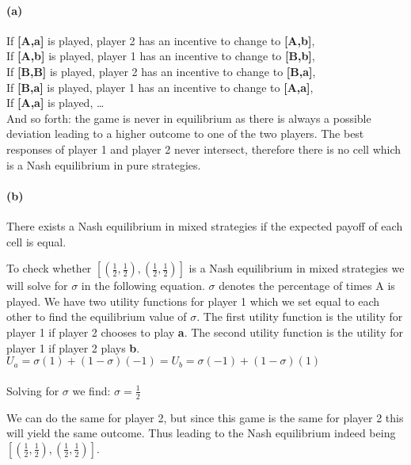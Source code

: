 \documentclass[]{article}
\let\oldparagraph\paragraph
\renewcommand{\paragraph}[1]{\oldparagraph{#1}\mbox{}}
\begin{document}
\paragraph{(a)}\label{a}

If \textbf{[A,a]} is played, player 2 has an incentive to change to
\textbf{[A,b]},\\
If \textbf{[A,b]} is played, player 1 has an incentive to change to
\textbf{[B,b]},\\
If \textbf{[B,B]} is played, player 2 has an incentive to change to
\textbf{[B,a]},\\
If \textbf{[B,a]} is played, player 1 has an incentive to change to
\textbf{[A,a]},\\
If \textbf{[A,a]} is played, \ldots{}\\
And so forth: the game is never in equilibrium as there is always a
possible deviation leading to a higher outcome to one of the two
players. The best responses of player 1 and player 2 never intersect, therefore there is no cell which is a Nash equilibrium in pure strategies.

\paragraph{(b)}\label{b}

There exists a Nash equilibrium in mixed strategies if the expected
payoff of each cell is equal. 

To check whether $[(\frac{1}{2},\frac{1}{2}),(\frac{1}{2},\frac{1}{2})] $ is a Nash equilibrium in mixed strategies we will solve for $\sigma$ in the following  equation. $\sigma$ denotes the percentage of times A is played. We have two utility functions for player 1 which we set equal to each other to find the equilibrium value of $\sigma$. The first utility function is the utility for player 1 if player 2 chooses to play \textbf{a}. The second utility function is the utility for player 1 if player 2 plays \textbf{b}.  \\

$
U_a=\sigma(1)+(1-\sigma)(-1)=U_b=\sigma(-1)+(1-\sigma)(1) $\\
\\
Solving for $\sigma$ we find:
$\sigma=\frac{1}{2}$

We can do the same for player 2, but since this game is the same for player 2 this will yield the same outcome. Thus leading to the Nash equilibrium indeed being $[(\frac{1}{2},\frac{1}{2}),(\frac{1}{2},\frac{1}{2})] $.
\end{document}
